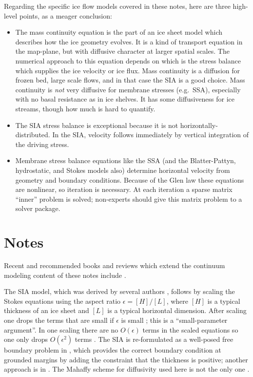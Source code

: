 \documentclass[letterpaper,final,12pt,reqno]{amsart}
\newcommand{\eps}{\epsilon}
\begin{document}
Regarding the specific ice flow models covered in these notes, here are three high-level points, as a meager conclusion:
\begin{itemize}
\item The mass continuity equation is the part of an ice sheet model which describes how the ice geometry evolves.  It is a kind of transport equation in the map-plane, but with diffusive character at larger spatial scales.  The numerical approach to this equation depends on which is the stress balance which supplies the ice velocity or ice flux.  Mass continuity is a diffusion for frozen bed, large scale flows, and in that case the SIA is a good choice.  Mass continuity is \emph{not} very diffusive for membrane stresses (e.g.~SSA), especially with no basal resistance as in ice shelves.  It has some diffusiveness for ice streams, though how much is hard to quantify.
\item The SIA stress balance is exceptional because it is not horizontally-distributed.  In the SIA, velocity follows immediately by vertical integration of the driving stress.
\item Membrane stress balance equations like the SSA (and the Blatter-Pattyn, hydrostatic, and Stokes models also) determine horizontal velocity from geometry and boundary conditions.  Because of the Glen law these equations are nonlinear, so iteration is necessary.  At each iteration a sparse matrix ``inner'' problem is solved; non-experts should give this matrix problem to a solver package.
\end{itemize}



\section{Notes} \label{sec:nr}

Recent and recommended books and reviews which extend the continuum modeling content of these notes include \cite{CuffeyPaterson,GreveBlatter2009,SchoofHewitt2013,vanderVeen}.

The SIA model, which was derived by several authors \cite{FowlerLarson1978,Hutter,MorlandJohnson}, follows by scaling the Stokes equations using the aspect ratio $\eps = [H]/[L]$, where $[H]$ is a typical thickness of an ice sheet and $[L]$ is a typical horizontal dimension.  After scaling one drops the terms that are small if $\eps$ is small \cite{Fowler,Hutter}; this is a ``small-parameter argument''.  In one scaling there are no $O(\eps)$ terms in the scaled equations so one only drops $O(\eps^2)$ terms \cite{Fowler}.  The SIA is re-formulated as a well-posed free boundary problem in \cite{JouvetBueler2012}, which provides the correct boundary condition at grounded margins by adding the constraint that the thickness is positive; another approach is in \cite{Bueler2016}.  The Mahaffy \cite{Mahaffy} scheme for diffusivity used here is not the only one \cite{HindmarshPayne}.
\end{document}
